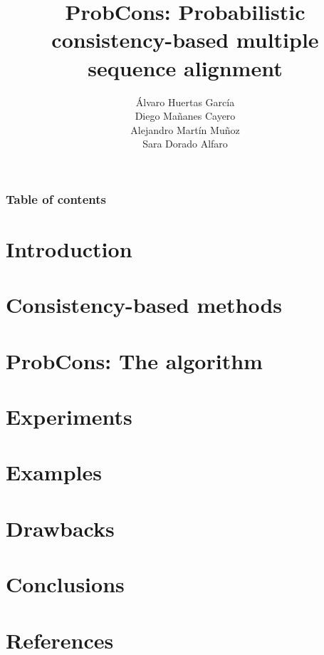 \documentclass[11pt]{beamer}
\title[ProbCons]{ProbCons: Probabilistic consistency-based multiple sequence alignment}
\author[PCALG - Presentation]{Álvaro Huertas García \\ Diego Mañanes Cayero
                 \\ Alejandro Martín Muñoz \\ Sara Dorado Alfaro}
\begin{document}
\frame{\titlepage}
\begin{frame}
    \frametitle{Table of contents}
    \tableofcontents
\end{frame}


\section{Introduction} 


\section{Consistency-based methods} 


\section{ProbCons: The algorithm}


\section{Experiments}


\section{Examples} 


\section{Drawbacks}


\section{Conclusions}




\section{References}


\frame{\titlepage}
\end{document}
